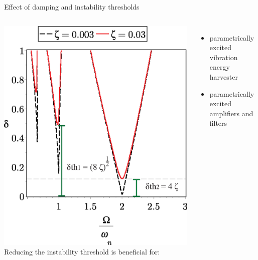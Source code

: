 \documentclass[LaTeX2e,10pt]{beamer}
\begin{document}
\begin{frame}{Effect of damping and instability thresholds}
       \begin{columns}
             \centering
             	\includegraphics[width=\linewidth]{Images/2/StuttDiagram2-1.eps}
						Reducing the instability threshold is beneficial for:
							\begin{itemize}
									\item parametrically excited vibration energy harvester
									\item parametrically excited amplifiers and filters
						\end{itemize}
         \end{columns} 
\end{frame}
\end{document}
